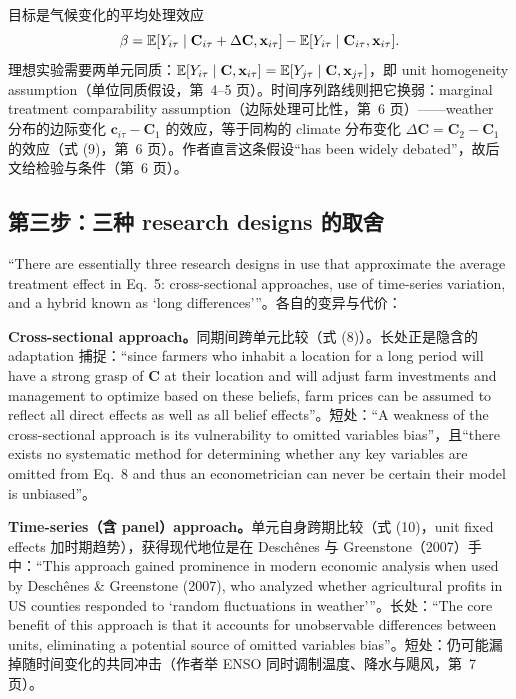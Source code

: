 目标是气候变化的平均处理效应
\begin{equation}
\beta = \mathbb{E}[Y_{i\tau}\mid\mathbf{C}_{i\tau}+\Delta\mathbf{C}, \mathbf{x}_{i\tau}] - \mathbb{E}[Y_{i\tau}\mid\mathbf{C}_{i\tau}, \mathbf{x}_{i\tau}] .
\label{eq:hs-ate}
\end{equation}
理想实验需要两单元同质：$\mathbb{E}[Y_{i\tau}\mid\mathbf{C},\mathbf{x}_{i\tau}] = \mathbb{E}[Y_{j\tau}\mid\mathbf{C},\mathbf{x}_{j\tau}]$，即 unit homogeneity assumption（单位同质假设，第~4--5 页）。时间序列路线则把它换弱：marginal treatment comparability assumption（边际处理可比性，第~6 页）——weather 分布的边际变化 $\mathbf{c}_{i\tau}-\mathbf{C}_1$ 的效应，等于同构的 climate 分布变化 $\Delta\mathbf{C} = \mathbf{C}_2-\mathbf{C}_1$ 的效应（式 (9)，第~6 页）。作者直言这条假设``has been widely debated''\citep[第~6 页]{hsiang2016climate}，故后文给检验与条件（第~6 页）。

\subsection{第三步：三种 research designs 的取舍}

``There are essentially three research designs in use that approximate the average treatment effect in Eq.~5: cross-sectional approaches, use of time-series variation, and a hybrid known as `long differences'''\citep[第~5 页]{hsiang2016climate}。各自的变异与代价：

\textbf{Cross-sectional approach。}同期间跨单元比较（式 (8)）。长处正是隐含的 adaptation 捕捉：``since farmers who inhabit a location for a long period will have a strong grasp of $\mathbf{C}$ at their location and will adjust farm investments and management to optimize based on these beliefs, farm prices can be assumed to reflect all direct effects as well as all belief effects''\citep[第~5 页；此处在原文中即对 Mendelsohn 等 1994 农地价值路线的概括]{hsiang2016climate}。短处：``A weakness of the cross-sectional approach is its vulnerability to omitted variables bias''\citep[第~5 页]{hsiang2016climate}，且``there exists no systematic method for determining whether any key variables are omitted from Eq.~8 and thus an econometrician can never be certain their model is unbiased''\citep[第~5 页]{hsiang2016climate}。

\textbf{Time-series（含 panel）approach。}单元自身跨期比较（式 (10)，unit fixed effects 加时期趋势），获得现代地位是在 Deschênes 与 Greenstone（2007）手中：``This approach gained prominence in modern economic analysis when used by Deschênes \& Greenstone (2007), who analyzed whether agricultural profits in US counties responded to `random fluctuations in weather'''\citep[第~7 页；更早可追溯至 Huntington 1922 的工厂工人数据设想，第~6--7 页]{hsiang2016climate}。长处：``The core benefit of this approach is that it accounts for unobservable differences between units, eliminating a potential source of omitted variables bias''\citep[第~7 页]{hsiang2016climate}。短处：仍可能漏掉随时间变化的共同冲击（作者举 ENSO 同时调制温度、降水与飓风，第~7 页）。

